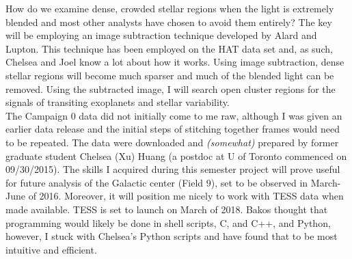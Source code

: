 \documentclass[11pt,letterpaper]{book} %
\begin{document}
How do we examine dense, crowded stellar regions when the light is extremely blended and most other analysts have chosen to avoid them entirely?  The key will be employing an image subtraction technique developed by Alard and Lupton. This technique has been employed on the HAT data set and, as such, Chelsea and Joel know a lot about how it works. Using image subtraction, dense stellar regions will become much sparser and much of the blended light can be removed. Using the subtracted image,  I will search open cluster regions for the signals of transiting exoplanets and stellar variability.\\ 
The Campaign 0 data did not initially come to me raw, although I was given an earlier data release and the initial steps of stitching together frames would need to be repeated. 
The data were downloaded and \textit{(somewhat)} prepared by former graduate student Chelsea (Xu) Huang (a postdoc at U of Toronto commenced on 09/30/2015). 
The skills I acquired during this semester project will prove useful for future analysis of the Galactic center (Field 9), set to be observed in March-June of 2016. Moreover, it will position me nicely to work with TESS data when made available.
TESS is set to launch on March of 2018. 
Bakos thought that programming would likely be done in shell scripts, C, and C++, and Python, however, I stuck with Chelsea's  Python scripts and have found that to be most intuitive and efficient.
\end{document}
